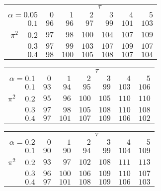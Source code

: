 \begin{tabular}{r|rrrrrr}
\hline\hline
 &\multicolumn{6}{c}{$\tau$} \\ 
 $\alpha = 0.05$ & $0$ & $1$ & $2$ & $3$ & $4$ & $5$ \\ 
 \hline$0.1$ & $ 96$ & $ 96$ & $ 97$ & $ 99$ & $101$ & $103$\\ 
$\pi^2\;\;\;$ $0.2$ & $ 97$ & $ 98$ & $100$ & $104$ & $107$ & $109$\\ 
$0.3$ & $ 97$ & $ 99$ & $103$ & $107$ & $109$ & $107$\\ 
$0.4$ & $ 98$ & $100$ & $105$ & $108$ & $107$ & $104$\\ 
 \hline 
 \end{tabular}
 
 \vspace{2em} 
 
\begin{tabular}{r|rrrrrr}
\hline\hline
 &\multicolumn{6}{c}{$\tau$} \\ 
 $\alpha = 0.1$ & $0$ & $1$ & $2$ & $3$ & $4$ & $5$ \\ 
 \hline$0.1$ & $ 93$ & $ 94$ & $ 95$ & $ 99$ & $103$ & $106$\\ 
$\pi^2\;\;\;$ $0.2$ & $ 95$ & $ 96$ & $100$ & $105$ & $110$ & $110$\\ 
$0.3$ & $ 97$ & $ 98$ & $105$ & $108$ & $110$ & $108$\\ 
$0.4$ & $ 97$ & $101$ & $107$ & $109$ & $106$ & $102$\\ 
 \hline 
 \end{tabular}
 
 \vspace{2em} 
 
\begin{tabular}{r|rrrrrr}
\hline\hline
 &\multicolumn{6}{c}{$\tau$} \\ 
 $\alpha = 0.2$ & $0$ & $1$ & $2$ & $3$ & $4$ & $5$ \\ 
 \hline$0.1$ & $ 90$ & $ 90$ & $ 94$ & $ 99$ & $104$ & $109$\\ 
$\pi^2\;\;\;$ $0.2$ & $ 93$ & $ 97$ & $102$ & $108$ & $111$ & $113$\\ 
$0.3$ & $ 96$ & $100$ & $106$ & $109$ & $110$ & $107$\\ 
$0.4$ & $ 97$ & $101$ & $108$ & $109$ & $106$ & $103$\\ 
 \hline 
 \end{tabular}